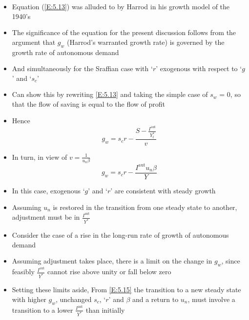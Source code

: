 \documentclass[a4paper,twoside]{article}
\numberwithin{equation}{section}
\numberwithin{figure}{section}
\begin{document}
\begin{itemize}
		\item Equation (\ref{E:5.13}) was alluded to by Harrod in his growth model of the 1940's
		\item The significance of the equation for the present discussion follows from the argument that \( g_w \) (Harrod's warranted growth rate) is governed by the growth rate of autonomous demand
		\item And simultaneously for the Sraffian case with `\( r \)' exogenous with respect to `\( g \)' and `\( s_c \)'
		\item Can show this by rewriting \cref{E:5.13} and taking the simple case of \( s_w \) = 0, so that the flow of saving is equal to the flow of profit
		\item Hence
		\begin{equation}
			g_w = s_cr - \frac{S-\frac{I^\text{aut}}{Y_t^*}}{v} \label{E:5.14}
		\end{equation}
		\item In turn, in view of \( v = \frac{1}{u_n \beta} \)
		\begin{equation}
			g_w = s_cr-\frac{I^\text{aut}u_n\beta}{Y} \label{E:5.15}
		\end{equation}
		\item In this case, exogenous `\( g \)' and `\( r \)' are consistent with steady growth
		\item Assuming \( u_n \) is restored in the transition from one steady state to another, adjustment must be in \( \frac{I^\text{aut}}{Y^*} \)
		\item Consider the case of a rise in the long-run rate of growth of autonomous demand
		\item Assuming adjustment takes place, there is a limit on the change in \( g_w \), since feasibly \( \frac{I^\text{aut}}{Y^*} \) cannot rise above unity or fall below zero
		\item Setting these limits aside, From \cref{E:5.15} the transition to a new steady state with higher \( g_w \), unchanged \( s_c \), `\( r \)' and \( \beta \) and a return to \( u_n \), must involve a transition to a lower \( \frac{I^\text{aut}}{Y^*} \) than initially
	\end{itemize}
\end{document}
